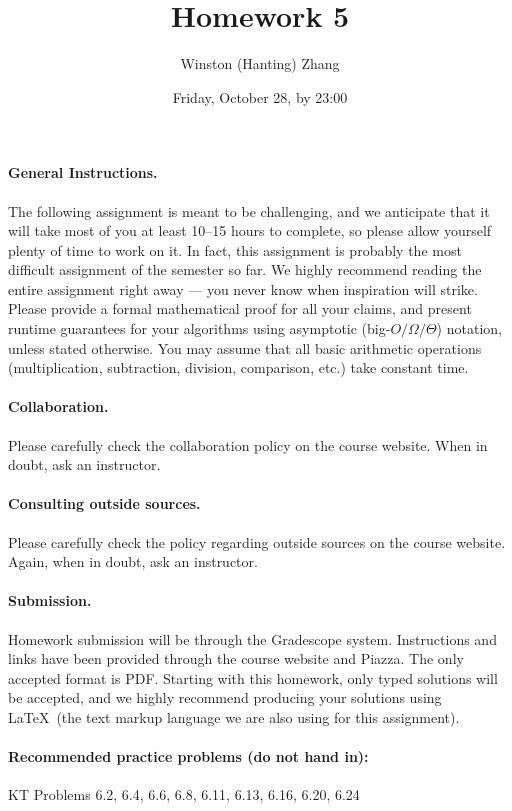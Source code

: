 \documentclass[10pt]{article}
\title{\bf Homework 5}
\author{Winston (Hanting) Zhang}
\date{Friday, October 28, by 23:00}
\begin{document}
\maketitle

\paragraph{General Instructions.} The following assignment is meant to be challenging, and we anticipate that it will take most of you at least 10--15 hours to complete, so please allow yourself plenty of time to work on it. In fact, this assignment is probably the most difficult assignment of the semester so far.
We highly recommend reading the entire assignment right away --- you never know when inspiration will strike.
Please provide a formal mathematical proof for all your claims, and  present runtime guarantees for your algorithms using asymptotic (big-$O/\Omega/\Theta$) notation, unless stated otherwise. You may assume that all basic arithmetic operations (multiplication, subtraction, division, comparison, etc.) take constant time. %

\paragraph{Collaboration.}  Please carefully check the collaboration policy on the course website. When in doubt, ask an instructor.

\paragraph{Consulting outside sources.} Please carefully check the policy regarding outside sources on the course website. Again, when in doubt, ask an instructor.

\paragraph{Submission.} Homework submission will be through the Gradescope system. Instructions and links have been provided through the course website and Piazza. The only accepted format is PDF. Starting with this homework, only typed solutions will be accepted, and we highly recommend producing your solutions using \LaTeX~(the text markup language we are also using for this assignment).

\paragraph{Recommended practice problems (do not hand in):} KT Problems 6.2, 6.4, 6.6, 6.8, 6.11, 6.13, 6.16, 6.20, 6.24
\end{document}
